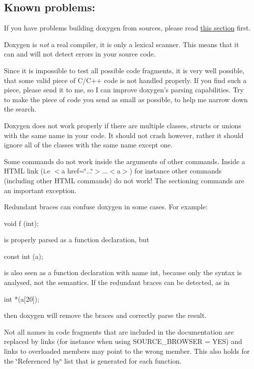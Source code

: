 \subsection*{Known problems:}


\begin{DoxyItemize}
\item If you have problems building doxygen from sources, please read \hyperlink{install_unix_problems}{this section} first. 
\item Doxygen is {\itshape not\/} a real compiler, it is only a lexical scanner. This means that it can and will not detect errors in your source code. 
\item Since it is impossible to test all possible code fragments, it is very well possible, that some valid piece of C/C++ code is not handled properly. If you find such a piece, please send it to me, so I can improve doxygen's parsing capabilities. Try to make the piece of code you send as small as possible, to help me narrow down the search. 
\item Doxygen does not work properly if there are multiple classes, structs or unions with the same name in your code. It should not crash however, rather it should ignore all of the classes with the same name except one. 
\item Some commands do not work inside the arguments of other commands. Inside a HTML link (i.e $<$a href=\char`\"{}...\char`\"{}$>$...$<$a$>$) for instance other commands (including other HTML commands) do not work! The sectioning commands are an important exception. 
\item Redundant braces can confuse doxygen in some cases. For example: \begin{DoxyVerb}
  void f (int);
\end{DoxyVerb}
 is properly parsed as a function declaration, but \begin{DoxyVerb}
  const int (a);
\end{DoxyVerb}
 is also seen as a function declaration with name {\ttfamily int}, because only the syntax is analysed, not the semantics. If the redundant braces can be detected, as in \begin{DoxyVerb}
  int *(a[20]);
\end{DoxyVerb}
 then doxygen will remove the braces and correctly parse the result. 
\item Not all names in code fragments that are included in the documentation are replaced by links (for instance when using {\ttfamily SOURCE\_\-BROWSER} = {\ttfamily YES}) and links to overloaded members may point to the wrong member. This also holds for the \char`\"{}Referenced by\char`\"{} list that is generated for each function.


\end{DoxyItemize}
